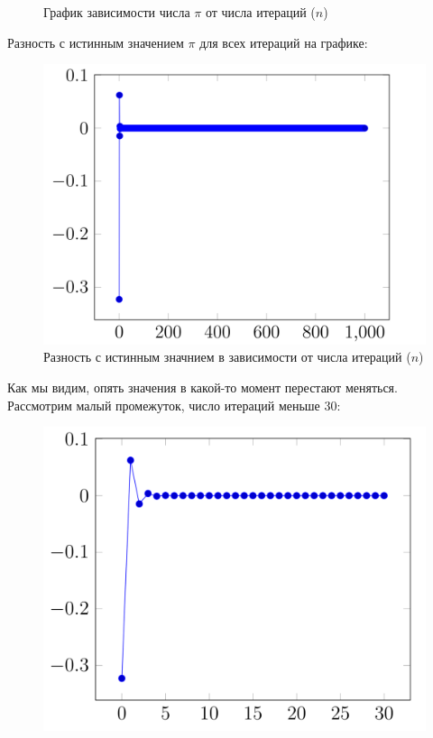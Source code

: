 \documentclass[a4paper, 12pt]{article}
\begin{document}
\begin{enumerate}
\begin{enumerate}
\begin{figure}[h!]
    		              \caption{График зависимости числа $\pi$ от числа итераций ($n$)}
                            \label{fig:my_label}
        		        \end{figure}
                        \newpage
                        Разность с истинным значением $\pi$ для всех итераций на графике: 
                        \begin{figure}[h!]
        		        \centering
    		              \includegraphics[scale = 0.2]{4-2.png}
    		              \caption{Разность с истинным значнием в зависимости от числа итераций ($n$)}
                            \label{fig:my_label}
        		        \end{figure}
                        \[\]
                        Как мы видим, опять значения в какой-то момент перестают меняться. Рассмотрим малый промежуток, число итераций меньше 30:
                        \begin{figure}[h!]
        		        \centering
    		              \includegraphics[scale = 0.2]{4-3.png}

\end{figure}
\end{enumerate}
\end{enumerate}
\end{document}
